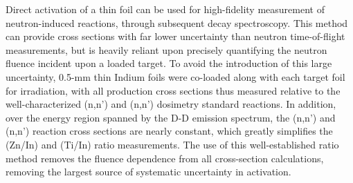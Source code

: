 \documentclass[5p]{elsarticle}
\begin{document}
Direct activation of a thin foil can be used for high-fidelity measurement of neutron-induced reactions, through subsequent decay spectroscopy. This method can provide cross sections with far lower uncertainty than neutron time-of-flight measurements, but is heavily reliant upon precisely quantifying the neutron fluence incident upon a loaded target. To avoid the introduction of this large uncertainty, 0.5-mm thin Indium foils were co-loaded along with each target foil for irradiation, with all production cross sections thus measured relative to the well-characterized (n,n') and (n,n') dosimetry standard reactions. In addition, over the energy region spanned by the D-D emission spectrum, the (n,n') and (n,n') reaction cross sections are nearly constant, which greatly simplifies the (Zn/In) and (Ti/In) ratio measurements. The use of this well-established ratio method removes the fluence dependence from all cross-section calculations, removing the largest source of systematic uncertainty in activation.
\end{document}
